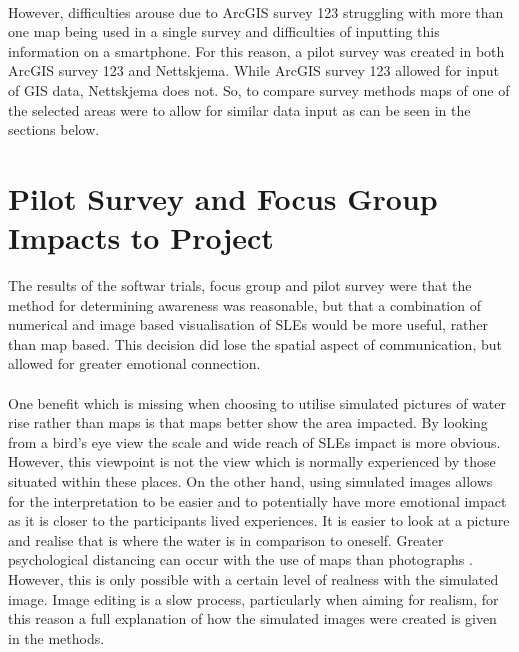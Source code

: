 \paragraph{}
However, difficulties arouse due to ArcGIS survey 123 struggling with more than one map being used in a single survey and difficulties of inputting this information on a smartphone. For this reason, a pilot survey was created in both ArcGIS survey 123 and Nettskjema. While ArcGIS survey 123 allowed for input of GIS data, Nettskjema does not. So, to compare survey methods maps of one of the selected areas were to allow for similar data input as can be seen in the sections below. 


\section{Pilot Survey and Focus Group Impacts to Project}
The results of the softwar trials, focus group and pilot survey were that the method for determining awareness was reasonable, but that a combination of numerical and image based visualisation of SLEs would be more useful, rather than map based. This decision did lose the spatial aspect of communication, but allowed for greater emotional connection.
\paragraph{}

One benefit which is missing when choosing to utilise simulated pictures of water rise rather than maps is that maps better show the area impacted. By looking from a bird’s eye view the scale and wide reach of SLEs impact is more obvious. However, this viewpoint is not the view which is normally experienced by those situated within these places. On the other hand, using simulated images allows for the interpretation to be easier and to potentially have more emotional impact as it is closer to the participants lived experiences. It is easier to look at a picture and realise that is where the water is in comparison to oneself. Greater psychological distancing can occur with the use of maps than photographs . However, this is only possible with a certain level of realness with the simulated image. Image editing is a slow process, particularly when aiming for realism, for this reason a full explanation of how the simulated images were created is given in the methods. 
\paragraph{}

